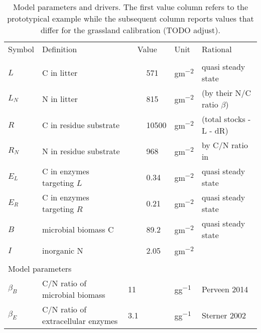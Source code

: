 % 

\begin{table}[t]
\caption{
\label{tab:modelParameters}
Model parameters and drivers. The first value column refers to the
prototypical example while the subsequent column reports values that
differ for the grassland calibration (TODO adjust). }
\vskip4mm
\centering
\begin{tabular}{lp{6cm}lllp{5.5cm}}
\tophline
Symbol &  Definition & \multicolumn{2}{c}{Value} & Unit & Rational \\
\middlehline
\multicolumn{6}{l}{State variables}  \\
$L$ &  C in litter & & 571 & \unit{gm^{-2}} & quasi steady state 
\\
$L_N$ &  N in litter & & 815 & \unit{gm^{-2}} & \citep{Perveen14}
(by their N/C ratio $\beta$)
\\
$R$ &  C in residue substrate & & 10500 & \unit{gm^{-2}} &
\citep{Allard07} (total stocks - L - dR)
\\
$R_N$ &  N in residue substrate & & 968 & \unit{gm^{-2}} & by C/N
ratio in \citep{Perveen14} \\
$E_L$ &  C in enzymes targeting $L$ & & 0.34 & \unit{gm^{-2}} & 
quasi steady state \\
$E_R$ &  C in enzymes targeting $R$ & & 0.21 & \unit{gm^{-2}} & 
quasi steady state \\
$B$ & microbial biomass C & & 89.2 & \unit{gm^{-2}} &  quasi steady
state \\
$I$ & inorganic N & & 2.05 & \unit{gm^{-2}} & \citep{Perveen14} \\
\\
\multicolumn{6}{l}{Model parameters}  \\
$\beta_B$ &  C/N ratio of microbial biomass & 11 & & \unit{gg^{-1}} &
Perveen 2014 
\\
$\beta_E$ &  C/N ratio of extracellular enzymes & 3.1 & &
\unit{gg^{-1}} & Sterner 2002 \\

\end{tabular}
\end{table}
